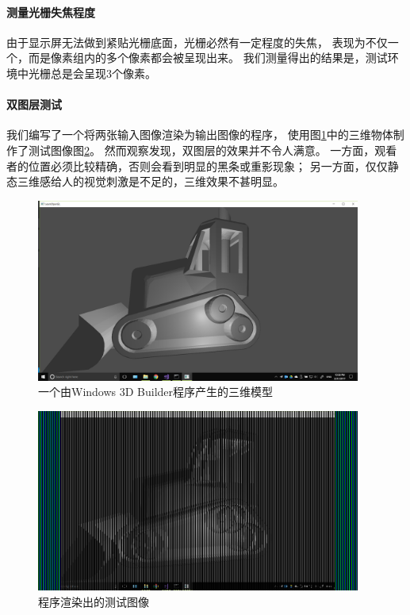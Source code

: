 \documentclass[12pt,a4paper]{article}
\begin{document}
\paragraph{测量光栅失焦程度}
由于显示屏无法做到紧贴光栅底面，光栅必然有一定程度的失焦，
表现为不仅一个，而是像素组内的多个像素都会被呈现出来。
我们测量得出的结果是，测试环境中光栅总是会呈现3个像素。

\paragraph{双图层测试}
我们编写了一个将两张输入图像渲染为输出图像的程序，
使用图\ref{双图层输入}中的三维物体制作了测试图像图\ref{双图层测试图像}。
然而观察发现，双图层的效果并不令人满意。
一方面，观看者的位置必须比较精确，否则会看到明显的黑条或重影现象；
另一方面，仅仅静态三维感给人的视觉刺激是不足的，三维效果不甚明显。
\begin{figure}[h!]
    \centering\includegraphics[height=6cm]{l}
    \caption{一个由Windows 3D Builder程序产生的三维模型}
    \label{双图层输入}
\end{figure}
\begin{figure}[h!]
    \centering\includegraphics[height=6cm]{lr}
    \caption{程序渲染出的测试图像}
    \label{双图层测试图像}
\end{figure}
\FloatBarrier
\end{document}
